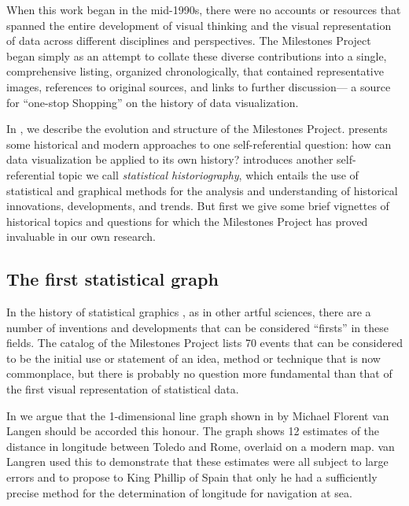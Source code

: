 When this work began in the mid-1990s, there were no accounts or resources that spanned the entire development of visual thinking and the visual representation of data across different disciplines and perspectives. The Milestones Project began simply as an attempt to collate these diverse contributions into a single, comprehensive listing, organized chronologically, that contained representative images, references to original sources, and links to further discussion--- a source for ``one-stop Shopping'' on the history of data visualization.

In , we describe the evolution and structure of the Milestones Project.  presents some historical and modern approaches to one self-referential question: how can data visualization be applied to its own history?  introduces another self-referential topic we call \emph{statistical historiography}, which entails the use of statistical and graphical methods for the analysis and understanding of historical innovations, developments, and trends. But first we give some brief vignettes of historical topics and questions for which the Milestones Project has proved invaluable in our own research.

\subsection{The first statistical graph}
In the history of statistical graphics \citep{Friendly:06:hbook}, as in other artful sciences, there are a number of inventions and developments that can be considered ``firsts'' in these fields. The catalog of the Milestones Project \citep{FriendlyDenis:01} lists 70 events that can be considered to be the initial use or statement of an idea, method or technique that is now commonplace, but there is probably no question more fundamental than that of the first visual representation of statistical data.

In \citet{Friendly-etal:2010:langren} we argue that the 1-dimensional line graph shown in  by Michael Florent van Langen \citep{Langren:1644} should be accorded this honour. The graph shows 12 estimates of the distance in longitude between Toledo and Rome, overlaid on a modern map. van Langren used this to demonstrate that these estimates were all subject to large errors and to
propose to King Phillip of Spain that only he had a sufficiently precise method for the determination of longitude for navigation at sea.

